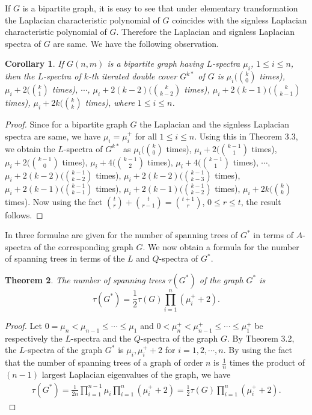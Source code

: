 \documentclass[12pt,a4paper]{amsart}
\newtheorem{theorem}{Theorem}[section]
\newtheorem{corollary}[theorem]{Corollary}
\theoremstyle{theorem}
\theoremstyle{definition}
\numberwithin{equation}{section} \makeatletter
\begin{document}
\indent If $G$ is a bipartite graph, it is easy to see that under elementary transformation the Laplacian characteristic polynomial of $G$ coincides with the signless Laplacian characteristic polynomial of $G$. Therefore the Laplacian and signless Laplacian spectra of $G$  are same. We have the following observation.

\begin{corollary}
If $G(n,m)$ is a bipartite graph having $L$-spectra $\mu_i$, $1\leq i\leq n$, then the $L$-spectra of $k$-th iterated double cover $G^{k*}$ of $G$ is  $\mu_i ({k \choose 0}$ times), $\mu_i+2  ({k \choose 1}$ times), $\cdots$, $\mu_i+2(k-2) ({k \choose k-2}$ times), $\mu_i+2(k-1) ({k \choose k-1}$ times), $\mu_i+2k ({k \choose k}$ times), where $1\leq i \leq n$.
\end{corollary}
\begin{proof}
Since for a bipartite graph $G$ the Laplacian and the signless Laplacian spectra are same, we have $\mu_i=\mu_i^{+}$ for all $  1\leq i \leq n$. Using this in Theorem 3.3, we obtain the $L$-spectra of $G^{k*}$ as  $\mu_i ({k \choose 0}$ times), $\mu_i+2 ({k-1 \choose 1}$ times), $\mu_i+2 ({k-1 \choose 0}$ times), $\mu_i+4 ({k-1 \choose 2}$ times), $\mu_i+4 ({k-1 \choose 1}$ times), $\cdots$, $\mu_i+2(k-2) ({k-1 \choose k-2}$ times), $\mu_i+2(k-2) ({k-1 \choose k-3}$ times), $\mu_i+2(k-1) ({k-1 \choose k-1}$ times), $\mu_i+2(k-1) ({k-1 \choose k-2}$ times), $\mu_i+2k ({k \choose k}$ times). Now using the fact ${t \choose r}+{t \choose {r-1}}={{t+1} \choose r}$, $0\leq r\leq t$, the result follows.
\end{proof}
\indent In \cite{c} three formulae are given for the number of spanning trees of $G^*$ in terms of $A$-spectra of the corresponding graph $G$. We now obtain a formula for the number of spanning trees in terms of the $L$ and $Q$-spectra of $G^*$.
\begin{theorem}
The number of spanning trees $\tau(G^*)$ of the graph $G^*$ is
$$\tau(G^*)=\frac{1}{2}\tau(G)\prod\limits_{i=1}^{n}(\mu_i^{+}+2).$$
\end{theorem}
\begin{proof}
Let $0=\mu_n<\mu_{n-1}\leq\cdots\leq\mu_1$ and $0<\mu^+_n<\mu^+_{n-1}\leq\cdots\leq\mu^+_1$  be respectively the $L$-spectra and the $Q$-spectra of the graph $G$. By Theorem 3.2, the $L$-spectra of the graph $G^*$ is $\mu_i, \mu_i^{+}+2$ for $i=1,2,\cdots,n$. By using the fact that the number of spanning trees of a graph of order $n$ is $\frac{1}{n}$ times the product of $(n-1)$ largest Laplacian eigenvalues of the graph, we have
\begin{align*}
\tau(G^*)=\frac{1}{2n}\prod\limits_{i=1}^{n-1}\mu_i\prod\limits_{i=1}^{n}(\mu_i^{+}+2)=\frac{1}{2}\tau(G)\prod\limits_{i=1}^{n}(\mu_i^{+}+2).
\end{align*}
\end{proof}
\end{document}
